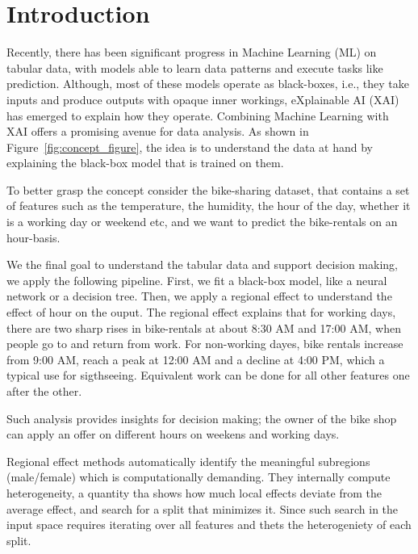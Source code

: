\documentclass[
twocolumn,
]{ceurart}
\begin{document}
\maketitle


\section{Introduction}
\label{sec:introduction}

Recently, there has been significant progress in Machine Learning (ML) on tabular data, with models able to learn data patterns and execute tasks like prediction. Although, most of these models operate as black-boxes, i.e., they take inputs and produce outputs with opaque inner workings, eXplainable AI (XAI) has emerged to explain how they operate. Combining Machine Learning with XAI offers a promising avenue for data analysis. As shown in Figure~\ref{fig:concept_figure}, the idea is to understand the data at hand by explaining the black-box model that is trained on them.

To better grasp the concept consider the bike-sharing dataset, that contains a set of features such as the temperature, the humidity, the hour of the day, whether it is a working day or weekend etc, and we want to predict the bike-rentals on an hour-basis.

We the final goal to understand the tabular data and support decision making, we apply the following pipeline. First, we fit a black-box model, like a neural network or a decision tree. Then, we apply a regional effect to understand the effect of hour on the ouput. The regional effect explains that for working days, there are two sharp rises in bike-rentals at about 8:30 AM and 17:00 AM, when people go to and return from work. For non-working dayes, bike rentals increase from 9:00 AM, reach a peak at 12:00 AM and a decline at 4:00 PM, which a typical use for sigthseeing. Equivalent work can be done for all other features one after the other.

Such analysis provides insights for decision making; the owner of the bike shop can apply an offer on different hours on weekens and working days.


Regional effect methods automatically identify the meaningful subregions (male/female) which is computationally demanding. They internally compute heterogeneity, a quantity tha shows how much local effects deviate from the average effect, and search for a split that minimizes it. Since such search in the input space requires iterating over all features and thets the heterogeniety of each split.
\end{document}
